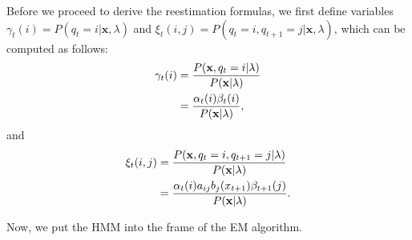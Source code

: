\documentclass[12pt,final,twoside]{report}
\begin{document}
Before we proceed to derive the reestimation formulas, we first define variables $\gamma_t(i) = P(q_t=i|\mathbf{x},\lambda)$ and $\xi_t(i,j) = P(q_t=i,q_{t+1}=j|\mathbf{x},\lambda)$, which can be computed as follows:
\begin{align}
  \gamma_t(i) &= \frac{P(\mathbf{x},q_t=i|\lambda)}{P(\mathbf{x}|\lambda)} \notag\\
  &= \frac{\alpha_t(i)\beta_t(i)}{P(\mathbf{x}|\lambda)} ,
  \label{eq:hmmgamma}
\end{align}
and
\begin{align}
  \xi_t(i,j) &= \frac{P(\mathbf{x},q_t=i,q_{t+1}=j|\lambda)}{P(\mathbf{x}|\lambda)} \notag\\
  &=  \frac{\alpha_t(i)a_{ij}b_j(x_{t+1})\beta_{t+1}(j)}{P(\mathbf{x}|\lambda)} .
  \label{eq:hmmxi}
\end{align}

Now, we put the HMM into the frame of the EM algorithm.
\end{document}

